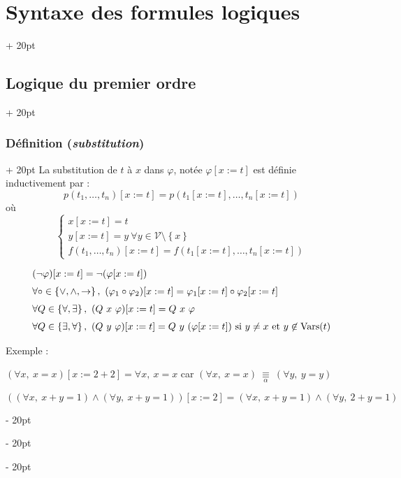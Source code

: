 \documentclass[a4paper, 12pt, twoside]{article}
\newcommand{\set}[1]{\left\{ #1 \right\}}
\newcommand{\ind}[1][20pt]{\advance\leftskip + #1}
\newcommand{\deind}[1][20pt]{\advance\leftskip - #1}
\newenvironment{indt}[2][20pt]{#2 \par \ind[#1]}{\par \deind} %
\begin{document}
\begin{indt}{\section{Syntaxe des formules logiques}}
\begin{indt}{\subsection{Logique du premier ordre}}
\begin{indt}{\subsubsection{Définition (\textit{substitution})}}
                La substitution de $t$ à $x$ dans $\varphi$, notée $\varphi [x := t]$ est définie inductivement par :
                    \[
                        p(t_1, \ldots, t_n) [x := t] = p(t_1[x := t], \ldots, t_n [x := t])
                    \]
                où
                    \[
                        \begin{cases}
                            x [x := t] = t
                            \\
                            y [x := t] = y\ \forall y \in \mathcal V \setminus \set x
                            \\
                            f(t_1, \ldots, t_n) [x := t] = f(t_1 [x := t], \ldots, t_n [x := t])
                        \end{cases}
                    \]
                    
                    \[
                        \begin{array}{l}
                            (\neg \varphi) [x := t] = \neg (\varphi [x := t])
                            \vspace{6pt}
                            \\
                            \forall \circ \in \set{\vee, \wedge, \rightarrow},\ (\varphi_1 \circ \varphi_2) [x := t] = \varphi_1[x := t] \circ \varphi_2 [x := t]
                            \vspace{6pt}
                            \\
                            \forall Q \in \set{\forall, \exists},\ (Q\ x\ \varphi)[x := t] = Q\ x\ \varphi
                            \vspace{6pt}
                            \\
                            \forall Q \in \set{\exists, \forall},\ (Q\ y\ \varphi)[x := t] = Q\ y\ (\varphi [x := t])\ \text{si $y \neq x$ et $y \not \in \mathrm{Vars}(t)$}
                        \end{array}
                    \]
                
                Exemple :
                
                $(\forall x,\ x = x)[x := 2 + 2] = \forall x,\ x = x$
                car
                $(\forall x,\ x = x)\ \underset{\alpha}{\equiv} \ (\forall y,\ y = y)$
                
                \vspace{6pt}
                
                $((\forall x,\ x + y = 1) \wedge (\forall y, \ x + y = 1))[x := 2] = (\forall x,\ x + y = 1) \wedge (\forall y,\ 2 + y = 1)$
                

\end{indt}
\end{indt}
\end{indt}
\end{document}
